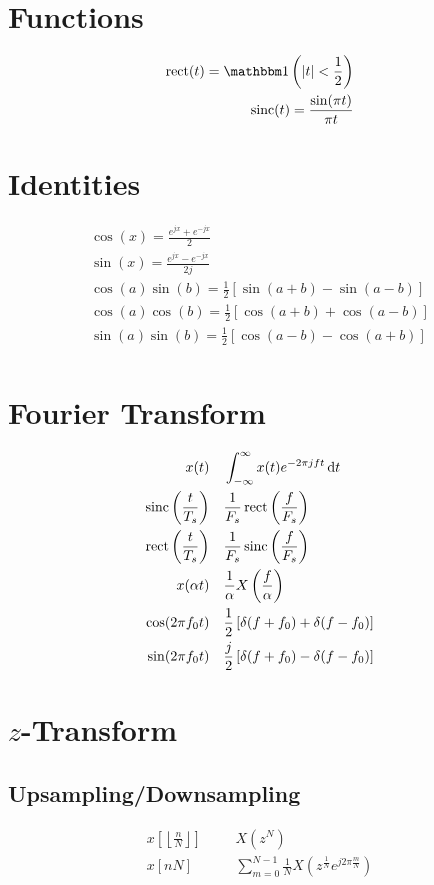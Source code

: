 \documentclass[a4paper]{IEEEtran}
\DeclareMathOperator{\rect}{rect}
\DeclareMathOperator{\sinc}{sinc}
\begin{document}
\section{Functions}
\begin{align}
\rect(t)=\true\left(|t|<\frac{1}{2}\right)\\\
\sinc(t)=\frac{\sin(\pi t)}{\pi t}\\
\end{align}
\section{Identities}
\begin{align}
\cos(x)=\frac{e^{jx}+e^{-jx}}{2}\\
\sin(x)=\frac{e^{jx}-e^{-jx}}{2j}\\
\cos(a)\sin(b)=\frac{1}{2}\left[\sin(a+b)-\sin(a-b)\right]\\
\cos(a)\cos(b)=\frac{1}{2}\left[\cos(a+b)+\cos(a-b)\right]\\
\sin(a)\sin(b)=\frac{1}{2}\left[\cos(a-b)-\cos(a+b)\right]\\
\end{align}
\section{Fourier Transform}
\begin{align}
x(t)&&&\int_{-\infty}^\infty x(t)e^{-2\pi j ft}\de t\\
\sinc\left(\frac{t}{T_s}\right)&&&\frac{1}{F_s}\rect\left(\frac{f}{F_s}\right)\\
\rect\left(\frac{t}{T_s}\right)&&&\frac{1}{F_s}\sinc\left(\frac{f}{F_s}\right)\\
x(\alpha t)&&&\frac{1}{\alpha}X\left(\frac{f}{\alpha}\right)\\
\cos(2\pi f_0t)&&&\frac{1}{2}\left[\delta(f+f_0)+\delta(f-f_0)\right]\\
\sin(2\pi f_0t)&&&\frac{j}{2}\left[\delta(f+f_0)-\delta(f-f_0)\right]
\end{align}
\section{$z$-Transform}
\subsection{Upsampling/Downsampling}
\begin{align}
x\left[\left\lfloor\frac{n}{N}\right\rfloor\right]&&&X(z^N)\\
x\left[nN\right]&&&\sum_{m=0}^{N-1}\frac{1}{N}X(z^{\frac{1}{N}}e^{j2\pi\frac{m}{N}})
\end{align}
\end{document}
